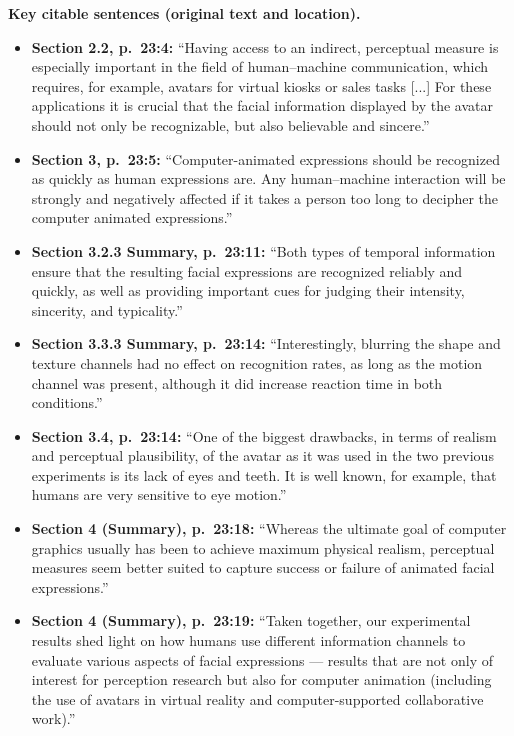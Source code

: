 \documentclass[11pt, a4paper]{article}
\begin{document}
\textbf{Key citable sentences (original text and location).}
\begin{itemize}[leftmargin=2em]
  \item \textbf{Section 2.2, p.\ 23:4:} ``Having access to an indirect, perceptual measure is especially important in the field of human–machine communication, which requires, for example, avatars for virtual kiosks or sales tasks [...] For these applications it is crucial that the facial information displayed by the avatar should not only be recognizable, but also believable and sincere.''
  \item \textbf{Section 3, p.\ 23:5:} ``Computer-animated expressions should be recognized as quickly as human expressions are. Any human–machine interaction will be strongly and negatively affected if it takes a person too long to decipher the computer animated expressions.''
  \item \textbf{Section 3.2.3 Summary, p.\ 23:11:} ``Both types of temporal information ensure that the resulting facial expressions are recognized reliably and quickly, as well as providing important cues for judging their intensity, sincerity, and typicality.''
  \item \textbf{Section 3.3.3 Summary, p.\ 23:14:} ``Interestingly, blurring the shape and texture channels had no effect on recognition rates, as long as the motion channel was present, although it did increase reaction time in both conditions.''
  \item \textbf{Section 3.4, p.\ 23:14:} ``One of the biggest drawbacks, in terms of realism and perceptual plausibility, of the avatar as it was used in the two previous experiments is its lack of eyes and teeth. It is well known, for example, that humans are very sensitive to eye motion.''
  \item \textbf{Section 4 (Summary), p.\ 23:18:} ``Whereas the ultimate goal of computer graphics usually has been to achieve maximum physical realism, perceptual measures seem better suited to capture success or failure of animated facial expressions.''
  \item \textbf{Section 4 (Summary), p.\ 23:19:} ``Taken together, our experimental results shed light on how humans use different information channels to evaluate various aspects of facial expressions --- results that are not only of interest for perception research but also for computer animation (including the use of avatars in virtual reality and computer-supported collaborative work).''
\end{itemize}
\end{document}
